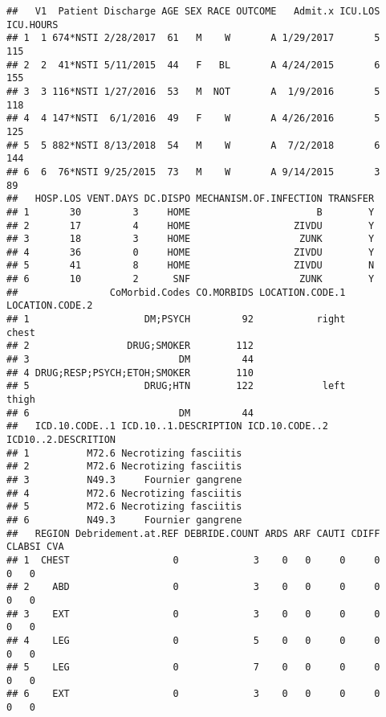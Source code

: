 \documentclass[]{article}
\begin{document}
\begin{verbatim}
##   V1  Patient Discharge AGE SEX RACE OUTCOME   Admit.x ICU.LOS ICU.HOURS
## 1  1 674*NSTI 2/28/2017  61   M    W       A 1/29/2017       5       115
## 2  2  41*NSTI 5/11/2015  44   F   BL       A 4/24/2015       6       155
## 3  3 116*NSTI 1/27/2016  53   M  NOT       A  1/9/2016       5       118
## 4  4 147*NSTI  6/1/2016  49   F    W       A 4/26/2016       5       125
## 5  5 882*NSTI 8/13/2018  54   M    W       A  7/2/2018       6       144
## 6  6  76*NSTI 9/25/2015  73   M    W       A 9/14/2015       3        89
##   HOSP.LOS VENT.DAYS DC.DISPO MECHANISM.OF.INFECTION TRANSFER
## 1       30         3     HOME                      B        Y
## 2       17         4     HOME                  ZIVDU        Y
## 3       18         3     HOME                   ZUNK        Y
## 4       36         0     HOME                  ZIVDU        Y
## 5       41         8     HOME                  ZIVDU        N
## 6       10         2      SNF                   ZUNK        Y
##                CoMorbid.Codes CO.MORBIDS LOCATION.CODE.1 LOCATION.CODE.2
## 1                    DM;PSYCH         92           right           chest
## 2                 DRUG;SMOKER        112                                
## 3                          DM         44                                
## 4 DRUG;RESP;PSYCH;ETOH;SMOKER        110                                
## 5                    DRUG;HTN        122            left           thigh
## 6                          DM         44                                
##   ICD.10.CODE..1 ICD.10..1.DESCRIPTION ICD.10.CODE..2 ICD10..2.DESCRITION
## 1          M72.6 Necrotizing fasciitis                                   
## 2          M72.6 Necrotizing fasciitis                                   
## 3          N49.3     Fournier gangrene                                   
## 4          M72.6 Necrotizing fasciitis                                   
## 5          M72.6 Necrotizing fasciitis                                   
## 6          N49.3     Fournier gangrene                                   
##   REGION Debridement.at.REF DEBRIDE.COUNT ARDS ARF CAUTI CDIFF CLABSI CVA
## 1  CHEST                  0             3    0   0     0     0      0   0
## 2    ABD                  0             3    0   0     0     0      0   0
## 3    EXT                  0             3    0   0     0     0      0   0
## 4    LEG                  0             5    0   0     0     0      0   0
## 5    LEG                  0             7    0   0     0     0      0   0
## 6    EXT                  0             3    0   0     0     0      0   0

\end{verbatim}
\end{document}
